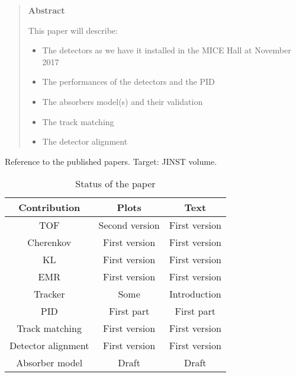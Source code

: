 \begin{quotation}
\begin{center}
\textbf{Abstract}
\end{center}
  \noindent
  This paper will describe:
  \begin{itemize}
    \item The detectors as we have it installed in the MICE Hall at November 2017
    \item The performances of the detectors and the PID
    \item The absorbers model(s) and their validation
    \item The track matching
    \item The detector alignment
  \end{itemize}
\end{quotation}

\noindent

Reference to the published papers.
Target: JINST volume.

\begin{table}[!ht]
  \caption{Status of the paper}
  \label{tab:}

  \begin{center}
    \begin{tabular}{c|c|c}
        \hline
       Contribution         & Plots             & Text\\
       \hline
       TOF                  & Second version    & First version \\
       Cherenkov            & First version     & First version \\
       KL                   & First version     & First version \\
       EMR                  & First version     & First version \\
       Tracker              & Some              & Introduction \\
       PID                  & First part        & First part \\
       Track matching       & First version     & First version \\
       Detector alignment   & First version     & First version \\
       Absorber model       & Draft             & Draft \\
       
       \hline
    \end{tabular}
  \end{center}
\end{table}
